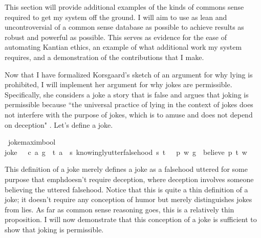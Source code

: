 \begin{isabellebody}
\begin{isamarkuptext}
This section will provide additional examples of the kinds of commons sense required to get my system
off the ground. I will aim to use as lean and uncontroversial of a common sense database as possible
to achieve results as robust and powerful as possible. This serves as evidence for the ease of automating
Kantian ethics, an example of what additional work my system requires, and a demonstration of the contributions
that I make.%
\end{isamarkuptext}\isamarkuptrue%
%
\begin{isamarkuptext}%
Now that I have formalized Korsgaard's sketch of an argument for why lying is prohibited, I will 
implement her argument for why jokes are permissible. Specifically, she considers a joke a story that is 
false and argues that joking is permissible because ``the universal practice of lying in the context of jokes
does not interfere with the purpose of jokes, which is to amuse and does not depend on
deception" \citep[4]{KorsgaardRTL}. Let's define a joke.%
\end{isamarkuptext}\isamarkuptrue%
\isamarkupfalse%
\ joke{\isacharcolon}{\isacharcolon}{\isachardoublequoteopen}maxim{\isasymRightarrow}bool{\isachardoublequoteclose}\ \ \isanewline
{\isachardoublequoteopen}joke\ {\isasymequiv}\ {\isasymlambda}\ {\isacharparenleft}c{\isacharcomma}\ a{\isacharcomma}\ g{\isacharparenright}{\isachardot}\ \ {\isasymexists}t{\isachardot}\ {\isacharparenleft}a\ \isactrlbold {\isasymlongrightarrow}\ {\isacharparenleft}{\isasymlambda}s{\isachardot}\ knowingly{\isacharunderscore}utter{\isacharunderscore}falsehood\ s\ t{\isacharparenright}{\isacharparenright}\ {\isasymand}\ {\isasymnot}\ {\isacharparenleft}{\isasymexists}p{\isachardot}\ {\isasymforall}w{\isachardot}\ {\isacharparenleft}g\ \isactrlbold {\isasymrightarrow}\ {\isacharparenleft}believe\ p\ t{\isacharparenright}{\isacharparenright}\ w{\isacharparenright}{\isachardoublequoteclose}%
\begin{isamarkuptext}%
This definition of a joke merely defines a joke as a falsehood uttered for some purpose that 
emph{doesn't} require deception, where deception involves someone believing the uttered falsehood. Notice 
that this is quite a thin definition of a joke; it doesn't require any conception of humor but merely
distinguishes jokes from lies. As far as common sense reasoning goes, this is a relatively thin proposition. 
I will now demonstrate that this conception of a joke is sufficient to show that joking is permissible.


\end{isamarkuptext}
\end{isabellebody}
